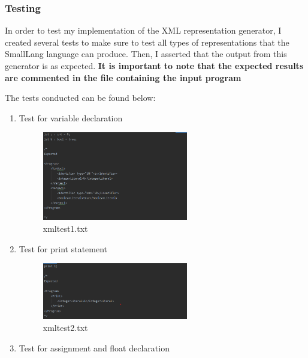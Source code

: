 \documentclass{article}
\begin{document}
				
				\subsubsection{Testing}
				
				In order to test my implementation of the XML representation generator, I created several tests to make sure to test all types of representations that the SmallLang language can produce. Then, I asserted that the output from this generator is as expected. \textbf{It is important to note that the expected results are commented in the file containing the input program}
				
				\noindent The tests conducted can be found below:
				
				\begin{enumerate}
				\item Test for variable declaration
				\begin{figure}[H]
					\centering
			 			\includegraphics[width=0.6\textwidth]{xmltest1.png}
			 			\centering
			  			\caption{xmltest1.txt}
			  			\label{fig:xmltest1}
					\end{figure}
					
				\item Test for print statement
				
				\begin{figure}[H]
					\centering
			 			\includegraphics[width=0.6\textwidth]{xmltest2.png}
			 			\centering
			  			\caption{xmltest2.txt}
			  			\label{fig:xmltest2}
					\end{figure}
					
					\item Test for assignment and float declaration
					

\end{enumerate}
\end{document}
